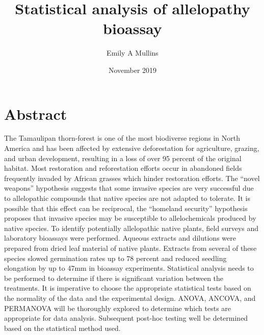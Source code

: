 \documentclass{article}
\title{Statistical analysis of allelopathy bioassay}
\author{Emily A Mullins }
\date{November 2019}
\begin{document}
\maketitle

\section{Abstract}
The Tamaulipan thorn-forest is one of the most biodiverse regions in North America and has been affected by extensive deforestation for agriculture, grazing, and urban development, resulting in a loss of over 95 percent of the original habitat. Most restoration and reforestation efforts occur in abandoned fields frequently invaded by African grasses which hinder restoration efforts. The “novel weapons” hypothesis suggests that some invasive species are very successful due to allelopathic compounds that native species are not adapted to tolerate. It is possible that this effect can be reciprocal, the “homeland security” hypothesis proposes that invasive species may be susceptible to allelochemicals produced by native species.\newline 
To identify potentially allelopathic native plants, field surveys and laboratory bioassays were performed. Aqueous extracts and dilutions were prepared from dried leaf material of native plants. Extracts from several of these species slowed germination rates up to 78 percent and reduced seedling elongation by up to 47mm in bioassay experiments. Statistical analysis needs to be performed to determine if there is significant variation between the treatments. It is imperative to choose the appropriate statistical tests based on the normality of the data and the experimental design. ANOVA, ANCOVA, and PERMANOVA will be thoroughly explored to determine which tests are appropriate for data analysis. Subsequent post-hoc testing well be determined based on the statistical method used. 
\end{document}
